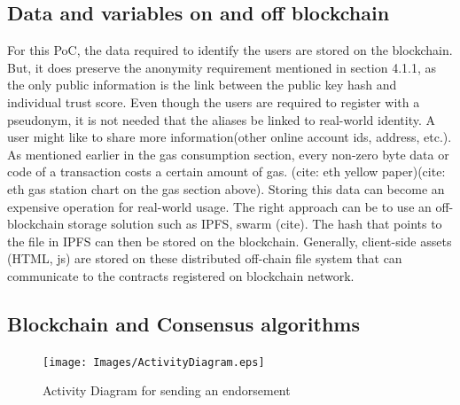 \subsection{Data and variables on and off blockchain}
For this PoC, the data required to identify the users are stored on the
blockchain. But, it does preserve the anonymity requirement mentioned in
section 4.1.1, as the only public information is the link between the public
key hash and individual trust score. Even though the users are required to
register with a pseudonym, it is not needed that the aliases be linked to
real-world identity. A user might like to share more information(other online
account ids, address, etc.).  As mentioned earlier in the gas consumption
section, every non-zero byte data or code of a transaction costs a certain
amount of gas. (cite: eth yellow paper)(cite: eth gas station chart on the gas
section above). Storing this data can become an expensive operation for
real-world usage. The right approach can be to use an off-blockchain storage
solution such as IPFS, swarm (cite). The hash that points to the file in IPFS
can then be stored on the blockchain. Generally, client-side assets (HTML, js)
are stored on these distributed off-chain file system that can communicate to
the contracts registered on blockchain network. 

\subsection{Blockchain and Consensus algorithms}




\begin{figure}
	\centering
	\texttt{[image: Images/ActivityDiagram.eps]}
	\caption{Activity Diagram for sending an endorsement}
	\label{fig:activity}
\end{figure}


